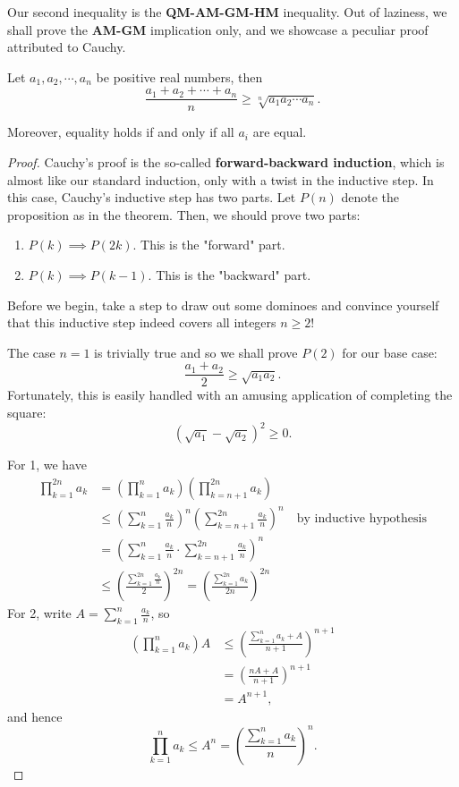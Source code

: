 \documentclass[../jarvis.tex]{subfiles}
\begin{document}
Our second inequality is the \textbf{QM-AM-GM-HM} inequality. Out of laziness, we shall prove the \textbf{AM-GM} implication only, and we showcase a peculiar proof attributed to Cauchy.
\begin{theorem}
    Let $a_1,a_2,\cdots,a_n$ be positive real numbers, then
    $$\frac{a_1+a_2+\cdots+a_n}{n}\geq \sqrt[n]{a_1a_2\cdots a_n}.$$

    Moreover, equality holds if and only if all $a_i$ are equal.
\end{theorem}
\begin{proof}
    Cauchy's proof is the so-called \textbf{forward-backward induction}, which is almost like our standard induction, only with a twist in the inductive step. In this case, Cauchy's inductive step has two parts. Let $P(n)$ denote the proposition as in the theorem. Then, we should prove two parts:
    \begin{enumerate}
        \item $P(k)\implies P(2k)$. This is the "forward" part.
        \item $P(k)\implies P(k-1)$. This is the "backward" part.
    \end{enumerate}
    Before we begin, take a step to draw out some dominoes and convince yourself that this inductive step indeed covers all integers $n\geq 2$!

    The case $n=1$ is trivially true and so we shall prove $P(2)$ for our base case:
    $$\frac{a_1+a_2}{2}\geq \sqrt{a_1a_2}.$$
    Fortunately, this is easily handled with an amusing application of completing the square:
    $$\left(\sqrt{a_1}-\sqrt{a_2}\right)^2\geq 0.$$

    For 1, we have
    \begin{align*}
        \prod_{k=1}^{2n} a_k&=\left(\prod_{k=1}^n a_k\right)\left(\prod_{k=n+1}^{2n}a_k\right) \\
        &\leq\left(\sum_{k=1}^n \frac{a_k}{n}\right)^n\left(\sum_{k=n+1}^{2n}\frac{a_k}{n}\right)^n \quad\text{by inductive hypothesis} \\
        &=\left(\sum_{k=1}^n \frac{a_k}{n}\cdot\sum_{k=n+1}^{2n}\frac{a_k}{n}\right)^n \\
        &\leq \left(\frac{\sum_{k=1}^{2n}\frac{a_k}{n}}{2}\right)^{2n} =\left(\frac{\sum_{k=1}^{2n}a_k}{2n}\right)^{2n}
    \end{align*}
    For 2, write $A=\sum_{k=1}^{n}\frac{a_k}{n}$, so
    \begin{align*}
        \left(\prod_{k=1}^{n}a_k\right)A&\leq \left(\frac{\sum_{k=1}^{n}a_k+A}{n+1}\right)^{n+1} \\
        &=\left(\frac{nA+A}{n+1}\right)^{n+1} \\
        &=A^{n+1},
    \end{align*}
    and hence 
    $$\prod_{k=1}^{n}a_k\leq A^{n}=\left(\frac{\sum_{k=1}^{n}a_k}{n}\right)^{n}.$$
\end{proof}
\subsection{}
\end{document}
